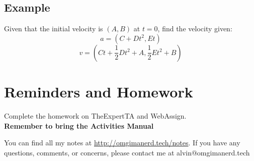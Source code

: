 \documentclass[letterpaper, 12pt]{math}
\begin{document}
\subsection*{Example}
Given that the initial velocity is \( (A,B) \) at \( t = 0 \), find
the velocity given:
\[ a = (C+Dt^2,Et) \]
\[ v = (Ct+\frac{1}{2}Dt^2+A,\frac{1}{2}Et^2+B) \]

\section*{Reminders and Homework}
Complete the homework on TheExpertTA and WebAssign. \\
\textbf{Remember to bring the Activities Manual}

\begin{center}
  You can find all my notes at \url{http://omgimanerd.tech/notes}. If you have
  any questions, comments, or concerns, please contact me at
  alvin@omgimanerd.tech
\end{center}
\end{document}
